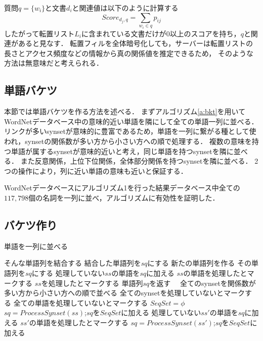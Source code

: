 \documentclass[master]{suribt}
\theoremstyle{definition}
\begin{document}
 質問$q=\{w_i\}$と文書$d_i$と関連値は以下のように計算する
 \begin{equation}
 Score_{d_j,q} = \sum_{w_i \in q}p_{ij}
 \end{equation}
 したがって転置リスト$L_i$に含まれている文書だけが$0$以上のスコアを持ち，$q$と関連があると見なす．
 転置フィルを全体暗号化しても，サーバーは転置リストの長さとアクセス頻度などの情報から真の関係値を推定できるため，
 そのような方法は無意味だと考えられる．
 
 \subsection{単語バケツ} 
 本節では単語バケツを作る方法を述べる．
 まずアルゴリズム\ref{a:bkt}を用いてWordNetデータベース中の意味的近い単語を隣にして全ての単語一列に並べる．
 リンクが多いsynsetが意味的に豊富であるため，単語を一列に繋がる種として使われ，synsetの関係数が多い方から小さい方への順で処理する．
 複数の意味を持つ単語が属するsynsetが意味的近いと考え，同じ単語を持つsynsetを隣に並べる．
 また反意関係，上位下位関係，全体部分関係を持つsynsetを隣に並べる．
 2つの操作により，列に近い単語の意味も近いと保証する．

 WordNetデータベースにアルゴリズム1を行った結果データベース中全ての$117,798$個の名詞を一列に並べ，アルゴリズムに有効性を証明した．

 \subsection{バケツ作り}
 \begin{algorithm}
 \caption{単語を一列に並べる}
 \begin{algorithmic}[1]
   \State そんな単語列を結合する
   \State 結合した単語列を$sq$にする
   \State 新たの単語列を作る
   \State その単語列を$sq$にする
  \EndIf
  \State 処理していない$ss$の単語を$sq$に加える
  \State $ss$の単語を処理したとマークする
  \State $ss$を処理したとマークする
  \State 単語列$sq$を返す　
 \EndFunction
  \State 全てのsynsetを関係数が多い方から小さい方への順で並べる
  \State 全てのsynsetを処理していないとマークする
  \State 全ての単語を処理していないとマークする
  \State $SeqSet = \phi$
   \State $sq=ProcessSynset(ss)$;$sq$を$SeqSet$に加える
    \State 処理していない$ss'$の単語を$sq$に加える
    \State $ss'$の単語を処理したとマークする
    \State $sq=ProcessSynset(ss')$;$sq$を$SeqSet$に加える　
   \EndFor
  \EndFor
 \EndFunction
 \end{algorithmic}
 \label{a:bkt}
 \end{algorithm}
\end{document}
